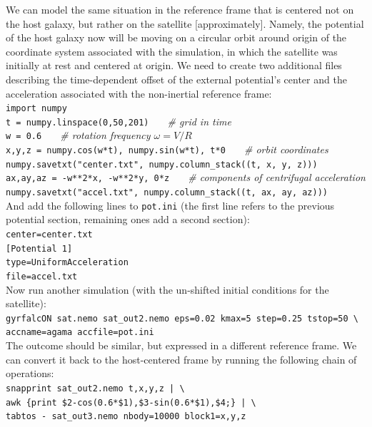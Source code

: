 \documentclass[12pt]{article}
\begin{document}
We can model the same situation in the reference frame that is centered not on the host galaxy, but rather on the satellite [approximately]. Namely, the potential of the host galaxy now will be moving on a circular orbit around origin of the coordinate system associated with the simulation, in which the satellite was initially at rest and centered at origin. We need to create two additional files describing the time-dependent offset of the external potential's center and the acceleration associated with the non-inertial reference frame:\\[2mm]
\texttt{import numpy\\t = numpy.linspace(0,50,201)}\textit{\color{Sepia} \ \ \ \# grid in time}\\
\texttt{w = 0.6}\textit{\color{Sepia} \ \ \ \# rotation frequency $\omega=V/R$}\\
\texttt{x,y,z = numpy.cos(w*t), numpy.sin(w*t), t*0}\textit{\color{Sepia} \ \ \ \# orbit coordinates}\\
\texttt{numpy.savetxt("center.txt", numpy.column_stack((t, x, y, z)))\\
ax,ay,az = -w**2*x, -w**2*y, 0*z}\textit{\color{Sepia} \ \ \ \# components of centrifugal acceleration}\\
\texttt{numpy.savetxt("accel.txt", numpy.column_stack((t, ax, ay, az)))}\\[2mm]
And add the following lines to \texttt{pot.ini} (the first line refers to the previous potential section, remaining ones add a second section):\\[2mm]
\texttt{center=center.txt}\\
\texttt{[Potential 1]\\
type=UniformAcceleration\\
file=accel.txt}\\[2mm]
Now run another simulation (with the un-shifted initial conditions for the satellite):\\[2mm]
\texttt{gyrfalcON sat.nemo sat_out2.nemo eps=0.02 kmax=5 step=0.25 tstop=50 \textbackslash \\
\makebox[7mm]{} accname=agama accfile=pot.ini}\\[2mm]
The outcome should be similar, but expressed in a different reference frame. We can convert it back to the host-centered frame by running the following chain of operations:\\[2mm]
\texttt{snapprint sat_out2.nemo t,x,y,z | \textbackslash \\
awk  \{print \$2-cos(0.6*\$1),\$3-sin(0.6*\$1),\$4;\}\ | \textbackslash \\
tabtos - sat_out3.nemo nbody=10000 block1=x,y,z}
\vspace{2mm}
\end{document}
